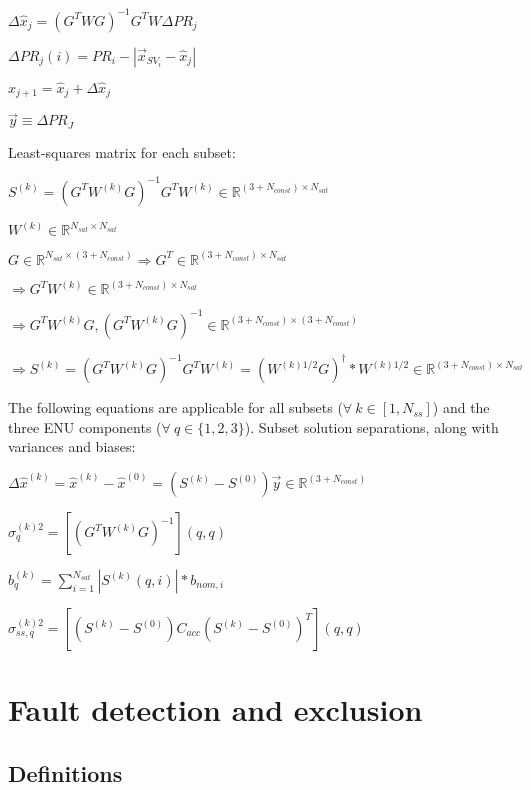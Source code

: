 \documentclass[11pt]{article}
\begin{document}
$\Delta \hat{x}_j=(G^T W G)^{-1} G^T W \Delta PR_j$

$\Delta PR_j(i)=PR_i-|\vec{x}_{SV_{i}}-\hat{x}_j|$

$\hat{x}_{j+1} = \hat{x}_j + \Delta \hat{x}_j$

$\vec{y} \equiv \Delta PR_J$

Least-squares matrix for each subset:

$S^{(k)} = (G^T W^{(k)} G)^{-1} G^T W^{(k)} \in \mathbb{R}^{(3+N_{const}) \times N_{sat}}$

$W^{(k)} \in \mathbb{R}^{N_{sat} \times N_{sat}}$

$G \in \mathbb{R}^{N_{sat} \times (3+N_{const})} \Rightarrow G^T \in \mathbb{R}^{(3+N_{const}) \times N_{sat}}$

$\Rightarrow G^T W^{(k)} \in \mathbb{R}^{(3+N_{const}) \times N_{sat}}$

$\Rightarrow G^T W^{(k)} G, (G^T W^{(k)} G)^{-1} \in \mathbb{R}^{(3+N_{const}) \times (3+N_{const})}$

$\Rightarrow S^{(k)} = (G^T W^{(k)} G)^{-1} G^T W^{(k)} = (W^{(k)1/2} G)^{\dagger} * W^{(k)1/2} \in \mathbb{R}^{(3+N_{const}) \times N_{sat}}$

The following equations are applicable for all subsets ($\forall \ k \in [1,N_{ss}]$) and the three ENU components ($\forall \ q \in \{1,2,3\}$). Subset solution separations, along with variances and biases:

$\Delta \hat{x}^{(k)} = \hat{x}^{(k)} - \hat{x}^{(0)} = (S^{(k)} - S^{(0)})\vec{y} \in \mathbb{R}^{(3+N_{const})}$

$\sigma_q^{(k)2} = [(G^T W^{(k)} G)^{-1}](q,q)$

$b_q^{(k)} = \sum_{i=1}^{N_{sat}}|S^{(k)}(q,i)|*b_{nom,i}$

$\sigma_{ss,q}^{(k)2} = [(S^{(k)}-S^{(0)})C_{acc}(S^{(k)}-S^{(0)})^T](q,q)$

\section{Fault detection and exclusion}

\subsection{Definitions}
\end{document}
